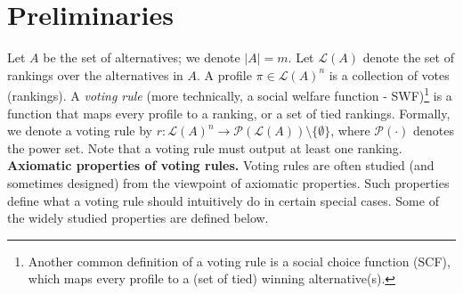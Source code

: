 \documentclass[prodmode,acmec]{ec-acmsmall}
\newcommand{\calL}{{\mathcal{L}}}
\newcommand{\rank}{{\calL(A)}}
\newcommand{\calP}{{\mathcal{P}}}
\begin{document}
\section{Preliminaries}
\label{sec:prelim}
Let $A$ be the set of alternatives; we denote $|A| = m$. Let $\rank$ denote the set of rankings over the alternatives in $A$. A profile $\pi \in \rank^n$ is a collection of votes (rankings). A \emph{voting rule} (more technically, a social welfare function - SWF)\footnote{Another common definition of a voting rule is a social choice function (SCF), which maps every profile to a (set of tied) winning alternative(s).} is a function that maps every profile to a ranking, or a set of tied rankings. Formally, we denote a voting rule by $r : \rank^n \rightarrow \calP(\rank)\setminus\{\emptyset\}$, where $\calP(\cdot)$ denotes the power set. Note that a voting rule must output at least one ranking. \\


\noindent \textbf{Axiomatic properties of voting rules.} Voting rules are often studied (and sometimes designed) from the viewpoint of axiomatic properties. Such properties define what a voting rule should intuitively do in certain special cases. Some of the widely studied properties are defined below. 
\end{document}
